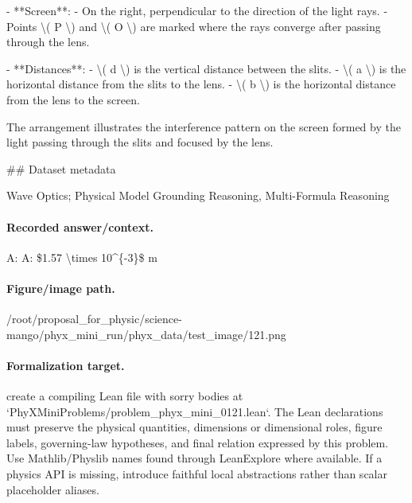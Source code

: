 - **Screen**:
  - On the right, perpendicular to the direction of the light rays.
  - Points \textbackslash{}( P \textbackslash{}) and \textbackslash{}( O \textbackslash{}) are marked where the rays converge after passing through the lens.

- **Distances**:
  - \textbackslash{}( d \textbackslash{}) is the vertical distance between the slits.
  - \textbackslash{}( a \textbackslash{}) is the horizontal distance from the slits to the lens.
  - \textbackslash{}( b \textbackslash{}) is the horizontal distance from the lens to the screen.

The arrangement illustrates the interference pattern on the screen formed by the light passing through the slits and focused by the lens.

\#\# Dataset metadata

Wave Optics; Physical Model Grounding Reasoning, Multi-Formula Reasoning

\paragraph{Recorded answer/context.}
A: A: \$1.57 \textbackslash{}times 10\textasciicircum{}\{-3\}\$ m

\paragraph{Figure/image path.}
/root/proposal\_for\_physic/science-mango/phyx\_mini\_run/phyx\_data/test\_image/121.png

\paragraph{Formalization target.}
create a compiling Lean file with sorry bodies at `PhyXMiniProblems/problem\_phyx\_mini\_0121.lean`. The Lean declarations must preserve the physical quantities, dimensions or dimensional roles, figure labels, governing-law hypotheses, and final relation expressed by this problem.
Use Mathlib/Physlib names found through LeanExplore where available. If a physics API is missing, introduce faithful local abstractions rather than scalar placeholder aliases.

